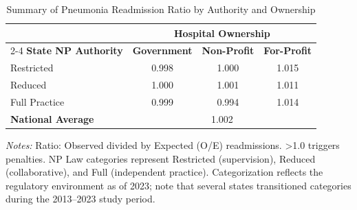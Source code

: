\begin{table}[htbp]
    \centering
    \caption{Summary of Pneumonia Readmission Ratio by Authority and Ownership}
    \label{tab:rrp_excess_ratio_pn}
    \vspace{0.2cm}
    \begin{tabular}{lccc}
        \toprule
        & \multicolumn{3}{c}{\textbf{Hospital Ownership}} \\
        \cmidrule(lr){2-4}
        \textbf{State NP Authority} & \textbf{Government} & \textbf{Non-Profit} & \textbf{For-Profit} \\
        \midrule
        Restricted & 0.998 & 1.000 & 1.015 \\
        Reduced & 1.000 & 1.001 & 1.011 \\
        Full Practice & 0.999 & 0.994 & 1.014 \\
        \midrule
        \textbf{National Average} & \multicolumn{3}{c}{1.002} \\
        \bottomrule
    \end{tabular}
    \vspace{0.1cm}
    \begin{minipage}{0.85\textwidth}
        \footnotesize \textit{Notes:} Ratio: Observed divided by Expected (O/E) readmissions. >1.0 triggers penalties. NP Law categories represent Restricted (supervision), Reduced (collaborative), and Full (independent practice). Categorization reflects the regulatory environment as of 2023; note that several states transitioned categories during the 2013--2023 study period.
    \end{minipage}
\end{table}